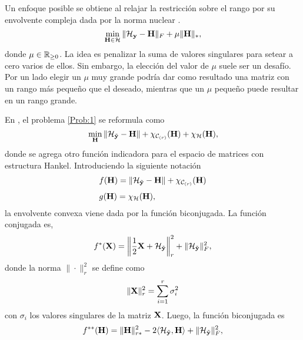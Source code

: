         Un enfoque posible se obtiene al relajar la restricción sobre el rango por su envolvente compleja dada por la norma nuclear \cite{Fazel2001,Recht2010}.	
        \begin{equation}
        	\min_{\mathbf{H}\in\mathcal{H}} \|\mathcal{H}_{\mathbf{y}}-\mathbf{H}\|_F + \mu\|\mathbf{H}\|_*,
        	\label{Eq:minNuclear}
        \end{equation}
        donde $\mu\in\mathbb{R}_{\geq 0}$. La idea es penalizar la suma de valores singulares para setear a cero varios de ellos. Sin embargo, la elección del valor de $\mu$ suele ser un desafío. Por un lado elegir un $\mu$ muy grande podría dar como resultado una matriz con un rango más pequeño que el deseado, mientras que un $\mu$ pequeño puede resultar en un rango grande.
        
        En \cite{Grussler2018}, el problema \eqref{Prob:1} se reformula como
        \begin{equation}
            \min_{\mathbf{H}} \|\mathcal{H}_{\tilde{\mathbf{y}}}-\mathbf{H}\| + \chi_{\mathcal{C}_{(r)}}(\mathbf{H}) + \chi_{\mathcal{H}}(\mathbf{H}),
            \label{eq:Grussler1}
        \end{equation}
        donde se agrega otro función indicadora para el espacio de matrices con estructura Hankel. Introduciendo la siguiente notación
        \begin{equation}
            \begin{aligned}
                & f(\mathbf{H}) = \|\mathcal{H}_{\tilde{\mathbf{y}}}-\mathbf{H}\| + \chi_{\mathcal{C}_{(r)}}(\mathbf{H})\\[0.3em]
                & g(\mathbf{H}) =  \chi_{\mathcal{H}}(\mathbf{H}),
            \end{aligned}
            \label{eq:Grussler2}
        \end{equation}
        la envolvente convexa viene dada por la función biconjugada. La función conjugada es,
        \begin{equation}
            f^*(\mathbf{X}) = \bigg\|\frac{1}{2}\mathbf{X}+\mathcal{H}_{\tilde{\mathbf{y}}}\bigg\|_r^2 + \|\mathcal{H}_{\tilde{\mathbf{y}}}\|_F^2,
            \label{eq:Grussler3}
        \end{equation}
        donde la norma $\|\cdot\|_r^2$ se define como
        \begin{equation}
            \|\mathbf{X}\|_r^2 = \sum_{i=1}^r\sigma_i^2
            \label{eq_Grussler4}
        \end{equation}
        con $\sigma_i$ los valores singulares de la matriz $\mathbf{X}$.
        Luego, la función biconjugada es
        \begin{equation}
            f^{**}(\mathbf{H}) = \|\mathbf{H}\|_{r*}^2 -2\langle \mathcal{H}_{\tilde{\mathbf{y}}},\mathbf{H}\rangle + \|\mathcal{H}_{\tilde{\mathbf{y}}}\|_F^2,
            \label{eq:Grussler5}
        \end{equation}
